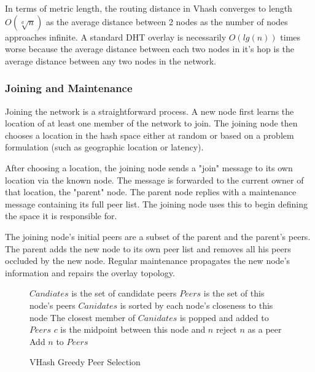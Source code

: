 \documentclass{article}
\begin{document}
In terms of metric length, the routing distance in Vhash converges to length $O(\sqrt[d]{n})$ as the average distance between 2 nodes as the number of nodes approaches infinite. A standard DHT overlay is necessarily $O(lg(n))$ times worse because the average distance between each two nodes in it's hop is the average distance between any two nodes in the network. 

\subsubsection*{Joining and Maintenance}
Joining the network is a straightforward process. A new node first learns the location of at least one member of the network to join. The joining node then chooses a location in the hash space either at random or based on a problem formulation (such as geographic location or latency).


After choosing a location, the joining node sends a "join" message to its own location via the known node.
The message is forwarded to the current owner of that location, the "parent" node.
The parent node replies with a maintenance message containing its full peer list. The joining node uses this to begin defining the space it is responsible for. 

The joining node's initial peers are a subset of the parent and the parent's peers. The parent adds the new node to its own peer list and removes all his peers occluded by the new node.  Regular maintenance propagates the new node's information and repairs the overlay topology. 

\begin{wrapfigure}{l}{0.5\textwidth}
\begin{minipage}{0.5\textwidth}
\begin{algorithm}[H]

\caption{VHash Greedy Peer Selection}
\label{peer}
{\footnotesize

\begin{algorithmic}[1]  %
	\STATE $Candiates$ is the set of candidate peers
    \STATE $Peers$ is the set of this node's peers
    \STATE $Canidates$ is sorted by each node's closeness to this node
    \STATE The closest member of $Canidates$ is popped and added to $Peers$
    	\STATE $c$ is the midpoint between this node and $n$
        	\STATE reject $n$ as a peer
        \ELSE
        	\STATE Add $n$ to $Peers$
        \ENDIF
    \ENDFOR
\end{algorithmic}
}
\end{algorithm}
    \end{minipage}
  \end{wrapfigure}
\end{document}
